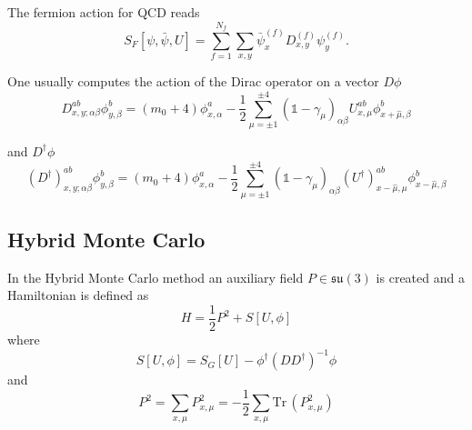 \documentclass[12pt,a4paper]{article}
\newcommand{\tr}{\text{Tr}\,}
\newcommand{\su}[1]{\mathfrak{su}({#1})}
\begin{document}
The fermion action for QCD reads
\begin{equation}
    S_{F}[\psi,\bar{\psi},U] = \sum_{f = 1}^{N_f} \sum_{x,y} \bar{\psi}^{(f)}_x D^{(f)}_{x,y} \psi^{(f)}_{y} .
\end{equation}

One usually computes the action of the Dirac operator on a vector $D\phi$
\begin{equation}
    D_{x,y;\alpha\beta}^{ab}\phi_{y,\beta}^{b} = (m_0+4)\phi_{x,\alpha}^{a} - \frac{1}{2}\sum_{\mu = \pm 1}^{\pm 4}\left(\mathds{1} - \gamma_{\mu} \right)_{\alpha\beta}U^{ab}_{x,\mu}\phi_{x+\hat{\mu},\beta}^{b}
\end{equation}

and $D^{\dagger}\phi$
\begin{equation}
    (D^{\dagger})_{x,y;\alpha\beta}^{ab}\phi_{y,\beta}^{b} = (m_0+4)\phi_{x,\alpha}^{a} - \frac{1}{2}\sum_{\mu = \pm 1}^{\pm 4}\left(\mathds{1} - \gamma_{\mu} \right)_{\alpha\beta}(U^{\dagger})^{ab}_{x-\hat{\mu},\mu}\phi_{x-\hat{\mu},\beta}^{b}
\end{equation}

\subsection{Hybrid Monte Carlo}
In the Hybrid Monte Carlo method an auxiliary field $P\in\su{3}$ is created and a Hamiltonian is defined as
 \begin{equation}
     H = \frac{1}{2}P^2 + S[U,\phi]
 \end{equation}
 where 
 \begin{equation}
     S[U,\phi] = S_G[U]-\phi^{\dagger}(DD^{\dagger})^{-1}\phi
 \end{equation}
 and
 \begin{equation}
     P^2 = \sum_{x,\mu} P_{x,\mu}^2 = -\frac{1}{2}\sum_{x,\mu} \tr(P_{x,\mu}^2)
 \end{equation}
\end{document}
